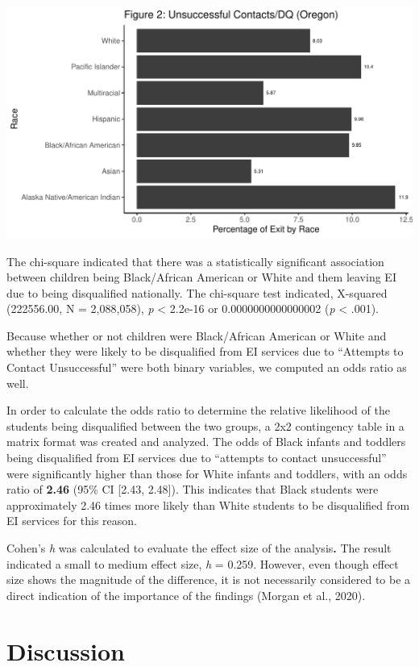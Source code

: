 \documentclass[
  letterpaper,
  DIV=11,
  numbers=noendperiod]{scrartcl}
\begin{document}
\includegraphics{v1_files/figure-pdf/unnamed-chunk-24-1.pdf}

The chi-square indicated that there was a statistically significant
association between children being Black/African American or White and
them leaving EI due to being disqualified nationally. The chi-square
test indicated, X-squared (222556.00, N = 2,088,058), \emph{p}
\textless{} 2.2e-16 or 0.0000000000000002 (\emph{p} \textless{} .001).

Because whether or not children were Black/African American or White and
whether they were likely to be disqualified from EI services due to
``Attempts to Contact Unsuccessful'' were both binary variables, we
computed an odds ratio as well.

In order to calculate the odds ratio to determine the relative
likelihood of the students being disqualified between the two groups, a
2x2 contingency table in a matrix format was created and analyzed. The
odds of Black infants and toddlers being disqualified from EI services
due to ``attempts to contact unsuccessful'' were significantly higher
than those for White infants and toddlers, with an odds ratio of
\textbf{2.46} (95\% CI {[}2.43, 2.48{]}). This indicates that Black
students were approximately 2.46 times more likely than White students
to be disqualified from EI services for this reason.

Cohen's \emph{h} was calculated to evaluate the effect size of the
analysis\textbf{.} The result indicated a small to medium effect size,
\emph{h} = 0.259. However, even though effect size shows the magnitude
of the difference, it is not necessarily considered to be a direct
indication of the importance of the findings (Morgan et al., 2020).

\section{Discussion}\label{discussion}
\end{document}
